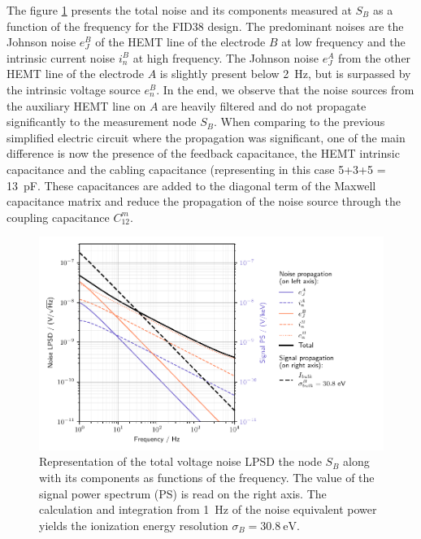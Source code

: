 The figure \ref{fig:planar38-propagation} presents the total noise and its components measured at $S_B$ as a function of the frequency for the FID38 design. The predominant noises are the Johnson noise $e_{J}^B$ of the HEMT line of the electrode $B$ at low frequency and the intrinsic current noise $i_n^B$ at high frequency. The Johnson noise $e_J^A$ from the other HEMT line of the electrode $A$ is slightly present below \SI{2}{\Hz}, but is surpassed by the intrinsic voltage source $e_n^B$. In the end, we observe that the noise sources from the auxiliary HEMT line on $A$ are heavily filtered and do not propagate significantly to the measurement node $S_B$. When comparing to the previous simplified electric circuit where the propagation was significant, one of the main difference is now the presence of the feedback capacitance, the HEMT intrinsic capacitance and the cabling capacitance (representing in this case 5+3+5 = \SI{13}{\pico\farad}. These capacitances are added to the diagonal term of the Maxwell capacitance matrix and reduce the propagation of the noise source through the coupling capacitance $C_{12}^m$.

\begin{figure}
\centering
\includegraphics[scale=1]{Figures/Electrodes/pl38_noise_propagation.pdf}
\caption{Representation of the total voltage noise LPSD the node $S_B$ along with its components as functions of the frequency. The value of the signal power spectrum (PS) is read on the right axis. The calculation and integration from \SI{1}{\Hz} of the noise equivalent power yields the ionization energy resolution $\sigma_{B} = \SI{30.8}{\eV}$.}
\label{fig:planar38-propagation}
\end{figure}

